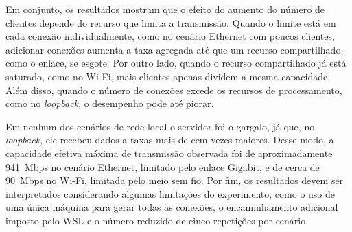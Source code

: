 \documentclass[12pt]{article}
\begin{document}
Em conjunto, os resultados mostram que o efeito do aumento do número de
clientes depende do recurso que limita a transmissão. Quando o limite está em
cada conexão individualmente, como no cenário Ethernet com poucos clientes,
adicionar conexões aumenta a taxa agregada até que um recurso compartilhado,
como o enlace, se esgote. Por outro lado, quando o recurso compartilhado já
está saturado, como no Wi-Fi, mais clientes apenas dividem a mesma capacidade.
Além disso, quando o número de conexões excede os recursos de processamento,
como no \textit{loopback}, o desempenho pode até piorar.

Em nenhum dos cenários de rede local o servidor foi o gargalo, já que, no
\textit{loopback}, ele recebeu dados a taxas mais de cem vezes maiores. Desse
modo, a capacidade efetiva máxima de transmissão observada foi de
aproximadamente 941~Mbps no cenário Ethernet, limitado pelo enlace Gigabit, e de
cerca de 90~Mbps no Wi-Fi, limitada pelo meio sem fio. Por fim, os resultados
devem ser interpretados considerando algumas limitações do experimento, como o
uso de uma única máquina para gerar todas as conexões, o encaminhamento
adicional imposto pelo WSL e o número reduzido de cinco repetições por cenário.


% 
% 
\end{document}
